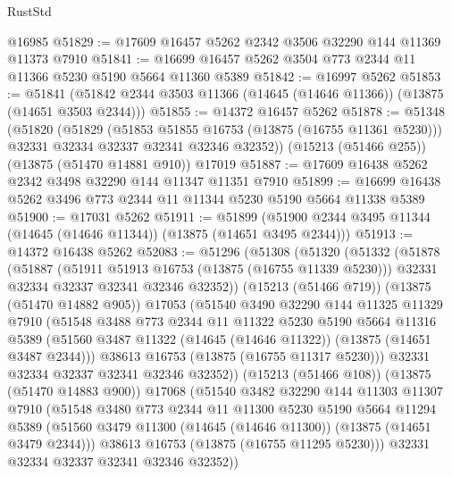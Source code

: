 \begin{lexlean}{RustStd}
\begin{coremodule}
    @16985
@51829 := @17609 @16457 @5262 @2342 @3506 @32290 @144 @11369 @11373 @7910
@51841 := @16699 @16457 @5262 @3504 @773 @2344 @11 @11366 @5230 @5190 @5664 @11360 @5389
@51842 := @16997 @5262
@51853 := @51841 (@51842 @2344 @3503 @11366 (@14645 (@14646 @11366)) (@13875 (@14651 @3503 @2344)))
@51855 := @14372 @16457 @5262
@51878 := @51348
    (@51820
      (@51829
        (@51853 @51855 @16753 (@13875 (@16755 @11361 @5230)))
        @32331
        @32334
        @32337
        @32341
        @32346
        @32352))
    (@15213 (@51466 @255))
    (@13875 (@51470 @14881 @910))
    @17019
@51887 := @17609 @16438 @5262 @2342 @3498 @32290 @144 @11347 @11351 @7910
@51899 := @16699 @16438 @5262 @3496 @773 @2344 @11 @11344 @5230 @5190 @5664 @11338 @5389
@51900 := @17031 @5262
@51911 := @51899 (@51900 @2344 @3495 @11344 (@14645 (@14646 @11344)) (@13875 (@14651 @3495 @2344)))
@51913 := @14372 @16438 @5262
@52083 := @51296
    (@51308
      (@51320
        (@51332
          (@51878
            (@51887
              (@51911 @51913 @16753 (@13875 (@16755 @11339 @5230)))
              @32331
              @32334
              @32337
              @32341
              @32346
              @32352))
          (@15213 (@51466 @719))
          (@13875 (@51470 @14882 @905))
          @17053
          (@51540
            @3490
            @32290
            @144
            @11325
            @11329
            @7910
            (@51548
              @3488
              @773
              @2344
              @11
              @11322
              @5230
              @5190
              @5664
              @11316
              @5389
              (@51560 @3487 @11322 (@14645 (@14646 @11322)) (@13875 (@14651 @3487 @2344)))
              @38613
              @16753
              (@13875 (@16755 @11317 @5230)))
            @32331
            @32334
            @32337
            @32341
            @32346
            @32352))
        (@15213 (@51466 @108))
        (@13875 (@51470 @14883 @900))
        @17068
        (@51540
          @3482
          @32290
          @144
          @11303
          @11307
          @7910
          (@51548
            @3480
            @773
            @2344
            @11
            @11300
            @5230
            @5190
            @5664
            @11294
            @5389
            (@51560 @3479 @11300 (@14645 (@14646 @11300)) (@13875 (@14651 @3479 @2344)))
            @38613
            @16753
            (@13875 (@16755 @11295 @5230)))
          @32331
          @32334
          @32337
          @32341
          @32346
          @32352))

\end{coremodule}
\end{lexlean}
